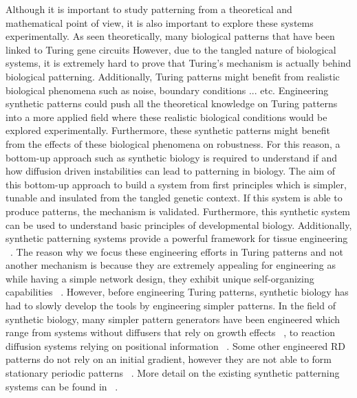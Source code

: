 Although it is important to study patterning from a theoretical and mathematical point of view, it is also important to explore these systems experimentally.
As seen theoretically, many biological patterns that have been linked to Turing gene circuits %
However, due to the tangled nature of biological systems, it is extremely hard to prove that Turing’s mechanism is actually behind biological patterning.
Additionally, Turing patterns might benefit from realistic biological phenomena such as noise, boundary conditions ... etc.
Engineering synthetic patterns could push all the theoretical knowledge on Turing patterns into a more applied field where these realistic biological conditions would be explored experimentally.
Furthermore, these synthetic patterns might benefit from the effects of these biological phenomena on robustness.
For this reason, a bottom-up approach such as synthetic biology is required to understand if and how diffusion driven instabilities can lead to patterning in biology.
The aim of this bottom-up approach to build a system from first principles which is simpler, tunable and insulated from the tangled genetic context.
If this system is able to produce patterns, the mechanism is validated.
Furthermore, this synthetic system can be used to understand basic principles of developmental biology.
Additionally, synthetic patterning systems provide a powerful framework for tissue engineering ~\parencite{Scholes2017}. %
The reason why we focus these engineering efforts in Turing patterns and not another mechanism is because they are extremely appealing for engineering as while having a simple network design, they exhibit unique self-organizing capabilities ~\parencite{Diambra2015a}.
However, before engineering Turing patterns, synthetic biology has had to slowly develop the tools by engineering simpler patterns.
In the field of synthetic biology, many simpler pattern generators have been engineered which range from systems without diffusers that rely on growth effects ~\parencite{Potvin-Trottier2016, Riglar2019}, to reaction diffusion systems relying on positional information ~\parencite{Barbier2020,Basu2005, Boehm2018, Grant2020, Kong2017, Schaerli2014}.
Some other engineered RD patterns do not rely on an initial gradient, however they are not able to form stationary periodic patterns ~\parencite{Cao2016, Danino2010, Payne2013}.
More detail on the existing synthetic patterning systems can be found in ~\parencite{huidobro}. %
